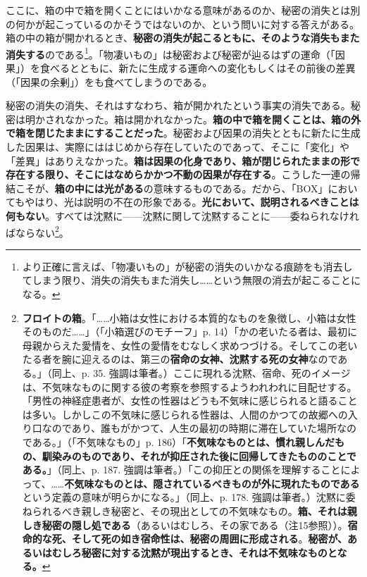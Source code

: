 \documentclass[a4paper]{jsarticle}
\begin{document}
ここに、箱の中で箱を開くことにはいかなる意味があるのか、秘密の消失とは別の何かが起こっているのかそうではないのか、という問いに対する答えがある。箱の中の箱が開かれるとき、\textbf{秘密の消失が起こるともに、そのような消失もまた消失する}のである\footnote{より正確に言えば、「物凄いもの」が秘密の消失のいかなる痕跡をも消去してしまう限り、消失の消失もまた消失し……という無限の消去が起こることになる。}。「物凄いもの」は秘密および秘密が辿るはずの運命（「因果」）を食べるとともに、新たに生成する運命への変化もしくはその前後の差異（「因果の余剰」）をも食べてしまうのである。

秘密の消失の消失、それはすなわち、箱が開かれたという事実の消失である。秘密は明かされなかった。箱は開かれなかった。\textbf{箱の中で箱を開くことは、箱の外で箱を閉じたままにすることだった}。秘密および因果の消失とともに新たに生成した因果は、実際にははじめから存在していたのであって、そこに「変化」や「差異」はありえなかった。\textbf{箱は因果の化身であり、箱が閉じられたままの形で存在する限り、そこにはなめらかかつ不動の因果が存在する}。こうした一連の帰結こそが、\textbf{箱の中には光がある}の意味するものである。だから、「BOX」においてもやはり、光は説明の不在の形象である。\textbf{光において、説明されるべきことは何もない}。すべては沈黙に------沈黙に関して沈黙することに------委ねられなければならない\footnote{\textbf{フロイトの箱}。「……小箱は女性における本質的なものを象徴し、小箱は女性そのものだ……」（「小箱選びのモチーフ」p. 14）「かの老いたる者は、最初に母親からえた愛情を、女性の愛情をむなしく求めつづける。そしてこの老いたる者を腕に迎えるのは、第三の\textbf{宿命の女神、沈黙する死の女神}なのである。」（同上、p. 35. 強調は筆者。）ここに現れる沈黙、宿命、死のイメージは、不気味なものに関する彼の考察を参照するようわれわれに目配せする。「男性の神経症患者が、女性の性器はどうも不気味に感じられると語ることは多い。しかしこの不気味に感じられる性器は、人間のかつての故郷への入り口なのであり、誰もがかつて、人生の最初の時期に滞在していた場所なのである。」（「不気味なもの」p. 186）「\textbf{不気味なものとは、慣れ親しんだもの、馴染みのものであり、それが抑圧された後に回帰してきたもののことである。}」（同上、p. 187. 強調は筆者。）「この抑圧との関係を理解することによって、……\textbf{不気味なものとは、隠されているべきものが外に現れたものである}という定義の意味が明らかになる。」（同上、p. 178. 強調は筆者。）沈黙に委ねられるべき親しき秘密と、その現出としての不気味なもの。\textbf{箱、それは親しき秘密の隠し処である}（あるいはむしろ、その家である（注15参照））。\textbf{宿命的な死、そして死の如き宿命性は、秘密の周囲に形成される}。\textbf{秘密が、あるいはむしろ秘密に対する沈黙が現出するとき、それは不気味なものとなる。}}。
\end{document}
